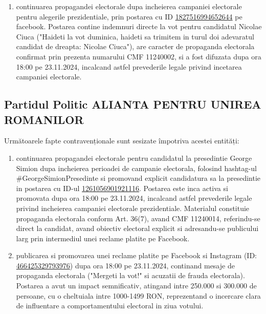 \documentclass[a4paper,12pt]{article}
\begin{document}
\begin{enumerate}[leftmargin=*, label=\arabic*.)]
    \item continuarea propagandei electorale dupa incheierea campaniei electorale pentru alegerile prezidentiale, prin postarea cu ID \href{https://www.facebook.com/ads/library/?id=1827516994652644}{1827516994652644} pe facebook. Postarea contine indemnuri directe la vot pentru candidatul Nicolae Ciuca ("Haideti la vot duminica, haideti sa trimitem in turul doi adevaratul candidat de dreapta: Nicolae Ciuca"), are caracter de propaganda electorala confirmat prin prezenta numarului CMF 11240002, si a fost difuzata dupa ora 18:00 pe 23.11.2024, incalcand astfel prevederile legale privind incetarea campaniei electorale.
\end{enumerate}

\vspace{0.5cm}

\subsection{Partidul Politic ALIANTA PENTRU UNIREA ROMANILOR}
Următoarele fapte contravenționale sunt sesizate împotriva acestei entități:

\begin{enumerate}[leftmargin=*, label=\arabic*.)]
    \item continuarea propagandei electorale pentru candidatul la presedintie George Simion dupa incheierea perioadei de campanie electorala, folosind hashtag-ul \#GeorgeSimionPresedinte si promovand explicit candidatura sa la presedintie in postarea cu ID-ul \href{https://www.facebook.com/ads/library/?id=1261056901921116}{1261056901921116}. Postarea este inca activa si promovata dupa ora 18:00 pe 23.11.2024, incalcand astfel prevederile legale privind incheierea campaniei electorale prezidentiale. Materialul constituie propaganda electorala conform Art. 36(7), avand CMF 11240014, referindu-se direct la candidat, avand obiectiv electoral explicit si adresandu-se publicului larg prin intermediul unei reclame platite pe Facebook.
    \item publicarea si promovarea unei reclame platite pe Facebook si Instagram (ID: \href{https://www.facebook.com/ads/library/?id=466425329793976}{466425329793976}) dupa ora 18:00 pe 23.11.2024, continand mesaje de propaganda electorala ("Mergeti la vot!" si acuzatii de frauda electorala). Postarea a avut un impact semnificativ, atingand intre 250.000 si 300.000 de persoane, cu o cheltuiala intre 1000-1499 RON, reprezentand o incercare clara de influentare a comportamentului electoral in ziua votului.
\end{enumerate}
\end{document}

